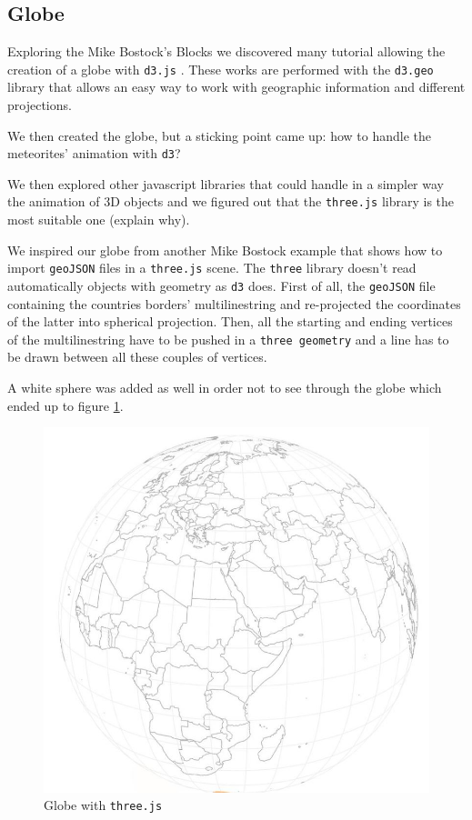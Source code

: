 \documentclass[10pt,conference,compsocconf]{IEEEtran}
\begin{document}
\subsection{Globe}
Exploring the Mike Bostock's Blocks \cite{bostock_mike_nodate} we discovered many tutorial allowing the creation of a globe with \texttt{d3.js} \cite{bostock_see-through_nodate,bostock_globe_nodate}.  These works are performed with the \texttt{d3.geo} library that allows an easy way to work with geographic information and different projections.

We then created the globe, but a sticking point came up: how to handle the meteorites' animation with \texttt{d3}?

We then explored other javascript libraries that could handle in a simpler way the animation of 3D objects and we figured out that the \texttt{three.js} library \cite{BibEntry2017Nov} is the most suitable one (explain why). %

We inspired our globe from another Mike Bostock example \cite{BibEntry2017Aug} that shows how to import \texttt{geoJSON} files in a \texttt{three.js} scene. The \texttt{three} library doesn't read automatically objects with geometry as \texttt{d3} does. First of all, the \texttt{geoJSON} file containing the countries borders' multilinestring \cite{countryfile} and re-projected the coordinates of the latter into spherical projection. Then, all the starting and ending vertices of the multilinestring have to be pushed in a \texttt{three geometry} and a line has to be drawn between all these couples of vertices.


A white sphere was added as well in order not to see through the globe which ended up to figure \ref{fig:globe}.

\begin{figure}[H]
  \centering
  \includegraphics[width=\columnwidth]{images/globe.jpg}
  \vspace{-3mm}
  \caption{Globe with \texttt{three.js}}
  \label{fig:globe}
\end{figure}
\end{document}

